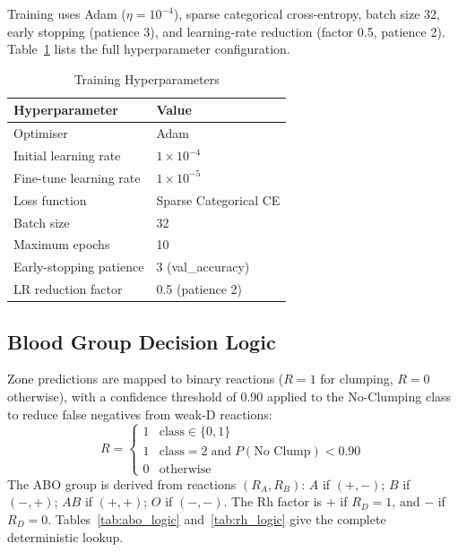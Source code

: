 \documentclass[conference]{IEEEtran}
\begin{document}
Training uses Adam ($\eta{=}10^{-4}$), sparse categorical
cross-entropy, batch size 32, early stopping (patience 3),
and learning-rate reduction (factor 0.5, patience 2).
Table~\ref{tab:training} lists the full hyperparameter configuration.

\begin{table}[htbp]
  \caption{Training Hyperparameters}
  \label{tab:training}
  \centering
  \begin{tabular}{ll}
    \toprule
    \textbf{Hyperparameter} & \textbf{Value} \\
    \midrule
    Optimiser               & Adam \\
    Initial learning rate   & $1 \times 10^{-4}$ \\
    Fine-tune learning rate & $1 \times 10^{-5}$ \\
    Loss function           & Sparse Categorical CE \\
    Batch size              & 32 \\
    Maximum epochs          & 10 \\
    Early-stopping patience & 3 (val\_accuracy) \\
    LR reduction factor     & 0.5 (patience 2) \\
    \bottomrule
  \end{tabular}
\end{table}

\subsection{Blood Group Decision Logic}

Zone predictions are mapped to binary reactions ($R{=}1$ for clumping,
$R{=}0$ otherwise), with a confidence threshold of 0.90 applied to
the No-Clumping class to reduce false negatives from weak-D reactions:
\begin{equation}
  R =
  \begin{cases}
    1 & \text{class} \in \{0,1\}\\
    1 & \text{class} = 2 \;\text{and}\; P(\text{No Clump}) < 0.90 \\
    0 & \text{otherwise}
  \end{cases}
  \label{eq:reaction}
\end{equation}
The ABO group is derived from reactions $(R_A, R_B)$:
$A$ if $(+,-)$; $B$ if $(-,+)$; $AB$ if $(+,+)$; $O$ if $(-,-)$.
The Rh factor is $+$ if $R_D{=}1$, and $-$ if $R_D{=}0$.
Tables~\ref{tab:abo_logic} and~\ref{tab:rh_logic} give the complete
deterministic lookup.
\end{document}
